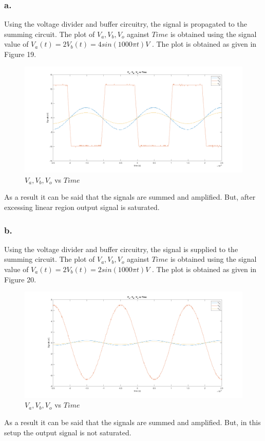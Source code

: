 \documentclass[letterpaper,12pt]{article}
\begin{document}
\subsubsection{a.}
Using the voltage divider and buffer circuitry, the signal is propagated to the summing circuit. The plot of \(V_{a} , V_{b} , V_{o} \) against \( Time\) is obtained using the signal value of \(V_{a}(t) = 2 V_{b}(t) = 4sin(1000\pi t) V\) . The plot is obtained as given in Figure 19.
\begin{figure}[H]
	\centering
   \includegraphics[width=1\textwidth]{e_3_a.png}
   \caption{\(V_{a} , V_{b} , V_{o} \) vs \( Time\)}
\end{figure} 
As a result it can be said that the signals are summed and amplified. But, after excessing linear region output signal is saturated.

\subsubsection{b.}
Using the voltage divider and buffer circuitry, the signal is supplied to the summing circuit. The plot of \(V_{a} , V_{b} , V_{o} \) against \( Time\) is obtained using the signal value of \(V_{a}(t) = 2 V_{b}(t) = 2sin(1000\pi t) V\) . The plot is obtained as given in Figure 20.
\begin{figure}[H]
	\centering
   \includegraphics[width=1\textwidth]{e_3_b.png}
   \caption{\(V_{a} , V_{b} , V_{o} \) vs \( Time\)}
\end{figure} 
As a result it can be said that the signals are summed and amplified. But, in this setup the output signal is not saturated.
\end{document}
